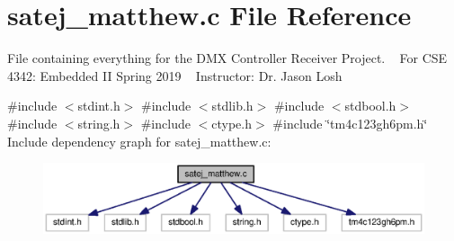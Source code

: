 \section{satej\+\_\+matthew.\+c File Reference}
\label{satej__matthew_8c}


File containing everything for the D\+MX Controller Receiver Project. ~\newline
 For C\+SE 4342\+: Embedded II Spring 2019 ~\newline
 Instructor\+: Dr. Jason Losh~\newline
  


{\ttfamily \#include $<$stdint.\+h$>$}\newline
{\ttfamily \#include $<$stdlib.\+h$>$}\newline
{\ttfamily \#include $<$stdbool.\+h$>$}\newline
{\ttfamily \#include $<$string.\+h$>$}\newline
{\ttfamily \#include $<$ctype.\+h$>$}\newline
{\ttfamily \#include \char`\"{}tm4c123gh6pm.\+h\char`\"{}}\newline
Include dependency graph for satej\+\_\+matthew.\+c\+:\nopagebreak
\begin{figure}[H]
\begin{center}
\leavevmode
\includegraphics[width=350pt]{satej__matthew_8c__incl}
\end{center}
\end{figure}
